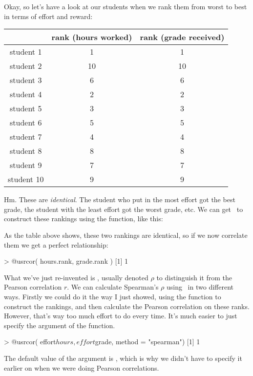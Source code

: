 Okay, so let's have a look at our students when we rank them from worst to best in terms of effort and reward: 
\begin{center}
\begin{tabular}{c|cc}
& rank (hours worked) & rank (grade received) \\ \hline
student    1 &   1 &   1 \\
student  2  & 10   &10 \\
student   3 &   6  &  6 \\
student    4 &   2 &   2 \\
student    5 &   3 &   3 \\
student   6  &  5  &  5 \\
student   7  &  4  &  4 \\
student   8  &  8  &  8 \\
student  9   & 7  &  7 \\
student   10  &  9&    9
\end{tabular}
\end{center}
Hm. These are {\it identical}. The student who put in the most effort got the best grade, the student with the least effort got the worst grade, etc. We can get \R\ to construct these rankings using the  function, like this:
As the table above shows, these two rankings are identical, so if we now correlate them we get a perfect relationship:
\begin{rblock1}
> @usr{cor( hours.rank, grade.rank )}
[1] 1
\end{rblock1}
What we've just re-invented is , usually denoted $\rho$ to distinguish it from the Pearson correlation $r$. We can calculate Spearman's $\rho$ using \R\ in two different ways. Firstly we could do it the way I just showed, using the  function to construct the rankings, and then calculate the Pearson correlation on these ranks. However, that's way too much effort to do every time. It's much easier to just specify the  argument of the  function. 
\begin{rblock1}
> @usr{cor( effort$hours, effort$grade, method = "spearman")}
[1] 1
\end{rblock1}
The default value of the  argument is , which is why we didn't have to specify it earlier on when we were doing Pearson correlations. 

